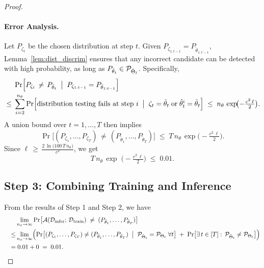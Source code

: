 \begin{proof}
\paragraph{Error Analysis.}
Let $P_{\zeta_t}$ be the chosen distribution at step $t$. 
Given $P_{\zeta_{1:t-1}} = P_{\tilde{\theta}_{1:t-1}}$, 
Lemma~\ref{lem:dist_discrim} ensures that any incorrect candidate can be detected with high probability, as long as $P_{\tilde{\theta}_t} \in {\mathcal{P}}_{\hat{\Theta}_t}$. Specifically,
\begin{align*}
&\Pr\Bigl[P_{\zeta_t} \,\neq\, P_{\tilde{\theta}_t}
  \;\bigm|\; 
  P_{\zeta_{1:t-1}} = P_{\tilde{\theta}_{1:t-1}}
\Bigr]\\
\;\le\;&
\sum_{i=2}^{n_\theta}
\Pr\Bigl[
  \text{distribution testing fails at step $i$}
  \;\bigm|\;
  \zeta_t = \tilde{\theta}_t 
  \;\text{or}\;
  \hat{\theta}_t^i = \tilde{\theta}_t
\Bigr]
\;\le\;
n_\theta\,\exp\!\bigl(-\tfrac{c^2\,\ell}{2}\bigr).
\end{align*}
A union bound over $t=1,\dots,T$ then implies
\[
\Pr\bigl[
  (P_{\zeta_1},\dots,P_{\zeta_T})
  \,\neq\,
  (P_{\tilde{\theta}_1},\dots,P_{\tilde{\theta}_T})
\bigr]
\;\le\;
T\,n_\theta\,\exp\!\bigl(-\tfrac{c^2\,\ell}{2}\bigr).
\]
Since
\(\ell \,\ge\, \tfrac{2\,\ln\bigl(100\,T\,n_\theta\bigr)}{c^2}\),
we get 
\[
T\,n_\theta\,\exp\;\bigl(-\tfrac{c^2\,\ell}{2}\bigr) 
\;\leq \;
0.01.
\]


\subsection*{Step 3: Combining Training and Inference}

From the results of Step 1 and Step 2, we have
\begin{align*}
&\lim_{n_x \to \infty} 
  \Pr\bigl[
    \mathcal{A}(\mathcal{D}_{\mathrm{infer}};\,\mathcal{D}_{\mathrm{train}}) 
    \;\neq\; 
    (P_{\tilde{\theta}_1}, \dots, P_{\tilde{\theta}_T})
  \bigr]
\\
\quad \le &
\lim_{n_x\to\infty} \Bigl(
  \Pr\bigl[
    (P_{\zeta_1},\dots,P_{\zeta_T}) 
    \neq 
    (P_{\tilde{\theta}_1}, \dots, P_{\tilde{\theta}_T})
    \;\bigm|\;
    {\mathcal{P}}_{\hat{\Theta}_t} = {\mathcal{P}}_{\Theta_t}
    \;\forall t
  \bigr]
  \;+\;
  \Pr\bigl[
    \exists\,t \in [T]:\, {\mathcal{P}}_{\hat{\Theta}_t} \neq {\mathcal{P}}_{\Theta_t}
  \bigr]
\Bigr)
\\
\quad = &\; 0.01 + 0 \;=\; 0.01.
\end{align*}
\end{proof}

